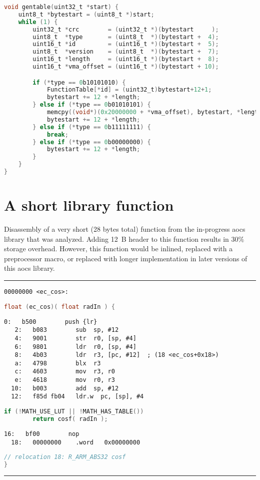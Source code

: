 \begin{appendices}
\begin{lstlisting}[language=C]
void gentable(uint32_t *start) {
	uint8_t *bytestart = (uint8_t *)start;
	while (1) {
		uint32_t *crc        = (uint32_t *)(bytestart     );
		uint8_t  *type       = (uint8_t  *)(bytestart +  4);
		uint16_t *id         = (uint16_t *)(bytestart +  5);
		uint8_t  *version    = (uint8_t  *)(bytestart +  7);
		uint16_t *length     = (uint16_t *)(bytestart +  8);
		uint16_t *vma_offset = (uint16_t *)(bytestart + 10);

		if (*type == 0b10101010) {
			FunctionTable[*id] = (uint32_t)bytestart+12+1;
			bytestart += 12 + *length;
		} else if (*type == 0b01010101) {
			memcpy((void*)(0x20000000 + *vma_offset), bytestart, *length);
			bytestart += 12 + *length;
		} else if (*type == 0b11111111) {
			break;
		} else if (*type == 0b00000000) {
			bytestart += 12 + *length;
		}
	}
}
\end{lstlisting}

\newpage
\section{A short library function}
\label{apx:cos}

Disassembly of a very short (28 bytes total) function from the in-progress \gls{aocs} library that was analyzed. Adding 12~B header to this function results in $30\%$ storage overhead. However, this function would be inlined, replaced with a preprocessor macro, or replaced with longer implementation in later versions of this \gls{aocs} library.

\rule{\textwidth}{0.4pt}
\begin{lstlisting}[style=asm,frame=none]
00000000 <ec_cos>:
\end{lstlisting}
\begin{lstlisting}[language=C,frame=none]
float (ec_cos)( float radIn ) {
\end{lstlisting}
\begin{lstlisting}[style=asm,frame=none]
   0:	b500      	push {lr}
   2:	b083      	sub  sp, #12
   4:	9001      	str  r0, [sp, #4]
   6:	9801      	ldr  r0, [sp, #4]
   8:	4b03      	ldr  r3, [pc, #12]	; (18 <ec_cos+0x18>)
   a:	4798      	blx  r3
   c:	4603      	mov  r3, r0
   e:	4618      	mov  r0, r3
  10:	b003      	add  sp, #12
  12:	f85d fb04 	ldr.w  pc, [sp], #4
\end{lstlisting}
\begin{lstlisting}[language=C,frame=none]
	if (!MATH_USE_LUT || !MATH_HAS_TABLE())
		return cosf( radIn );
\end{lstlisting}
\begin{lstlisting}[style=asm,frame=none]
  16:	bf00      	nop
  18:	00000000 	.word	0x00000000
\end{lstlisting}
\begin{lstlisting}[language=C,frame=none]
  // relocation 18: R_ARM_ABS32	cosf
}
\end{lstlisting}
\rule{\textwidth}{0.4pt}



\end{appendices}
